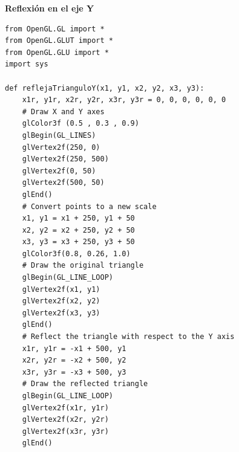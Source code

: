 \documentclass[a4paper]{article}
\begin{document}
\Large{\textbf{Reflexión en el eje Y}}\\[-0.4cm]
\begin{center}
\begin{mycodeboxl}
\begin{lstlisting}
from OpenGL.GL import *
from OpenGL.GLUT import *
from OpenGL.GLU import *
import sys

def reflejaTrianguloY(x1, y1, x2, y2, x3, y3):
    x1r, y1r, x2r, y2r, x3r, y3r = 0, 0, 0, 0, 0, 0
    # Draw X and Y axes
    glColor3f (0.5 , 0.3 , 0.9)
    glBegin(GL_LINES)
    glVertex2f(250, 0)
    glVertex2f(250, 500)
    glVertex2f(0, 50)
    glVertex2f(500, 50)
    glEnd()
    # Convert points to a new scale
    x1, y1 = x1 + 250, y1 + 50
    x2, y2 = x2 + 250, y2 + 50
    x3, y3 = x3 + 250, y3 + 50
    glColor3f(0.8, 0.26, 1.0)
    # Draw the original triangle
    glBegin(GL_LINE_LOOP)
    glVertex2f(x1, y1)
    glVertex2f(x2, y2)
    glVertex2f(x3, y3)
    glEnd()
    # Reflect the triangle with respect to the Y axis
    x1r, y1r = -x1 + 500, y1
    x2r, y2r = -x2 + 500, y2
    x3r, y3r = -x3 + 500, y3
    # Draw the reflected triangle
    glBegin(GL_LINE_LOOP)
    glVertex2f(x1r, y1r)
    glVertex2f(x2r, y2r)
    glVertex2f(x3r, y3r)
    glEnd()
\end{lstlisting}
\end{mycodeboxl}
\end{center}
\newpage
\end{document}
